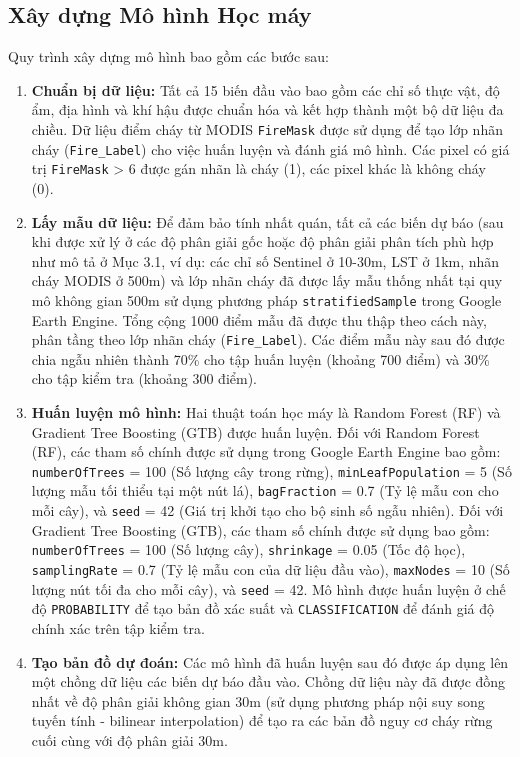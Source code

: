\documentclass{article}
\begin{document}
\subsection{Xây dựng Mô hình Học máy} %
Quy trình xây dựng mô hình bao gồm các bước sau:
\begin{enumerate}
    \item \textbf{Chuẩn bị dữ liệu:} Tất cả 15 biến đầu vào bao gồm các chỉ số thực vật, độ ẩm, địa hình và khí hậu được chuẩn hóa và kết hợp thành một bộ dữ liệu đa chiều. Dữ liệu điểm cháy từ MODIS \texttt{FireMask} được sử dụng để tạo lớp nhãn cháy (\texttt{Fire\_Label}) cho việc huấn luyện và đánh giá mô hình. Các pixel có giá trị \texttt{FireMask} > 6 được gán nhãn là cháy (1), các pixel khác là không cháy (0).
    \item \textbf{Lấy mẫu dữ liệu:} Để đảm bảo tính nhất quán, tất cả các biến dự báo (sau khi được xử lý ở các độ phân giải gốc hoặc độ phân giải phân tích phù hợp như mô tả ở Mục 3.1, ví dụ: các chỉ số Sentinel ở 10-30m, LST ở 1km, nhãn cháy MODIS ở 500m) và lớp nhãn cháy đã được lấy mẫu thống nhất tại quy mô không gian 500m sử dụng phương pháp \texttt{stratifiedSample} trong Google Earth Engine. Tổng cộng 1000 điểm mẫu đã được thu thập theo cách này, phân tầng theo lớp nhãn cháy (\texttt{Fire\_Label}). Các điểm mẫu này sau đó được chia ngẫu nhiên thành 70\% cho tập huấn luyện (khoảng 700 điểm) và 30\% cho tập kiểm tra (khoảng 300 điểm).
    \item \textbf{Huấn luyện mô hình:} Hai thuật toán học máy là Random Forest (RF) và Gradient Tree Boosting (GTB) được huấn luyện. 
        Đối với Random Forest (RF), các tham số chính được sử dụng trong Google Earth Engine bao gồm: \texttt{numberOfTrees} = 100 (Số lượng cây trong rừng), \texttt{minLeafPopulation} = 5 (Số lượng mẫu tối thiểu tại một nút lá), \texttt{bagFraction} = 0.7 (Tỷ lệ mẫu con cho mỗi cây), và \texttt{seed} = 42 (Giá trị khởi tạo cho bộ sinh số ngẫu nhiên).
        Đối với Gradient Tree Boosting (GTB), các tham số chính được sử dụng bao gồm: \texttt{numberOfTrees} = 100 (Số lượng cây), \texttt{shrinkage} = 0.05 (Tốc độ học), \texttt{samplingRate} = 0.7 (Tỷ lệ mẫu con của dữ liệu đầu vào), \texttt{maxNodes} = 10 (Số lượng nút tối đa cho mỗi cây), và \texttt{seed} = 42.
        Mô hình được huấn luyện ở chế độ \texttt{PROBABILITY} để tạo bản đồ xác suất và \texttt{CLASSIFICATION} để đánh giá độ chính xác trên tập kiểm tra.
    \item \textbf{Tạo bản đồ dự đoán:} Các mô hình đã huấn luyện sau đó được áp dụng lên một chồng dữ liệu các biến dự báo đầu vào. Chồng dữ liệu này đã được đồng nhất về độ phân giải không gian 30m (sử dụng phương pháp nội suy song tuyến tính - bilinear interpolation) để tạo ra các bản đồ nguy cơ cháy rừng cuối cùng với độ phân giải 30m.
\end{enumerate}
\end{document}
